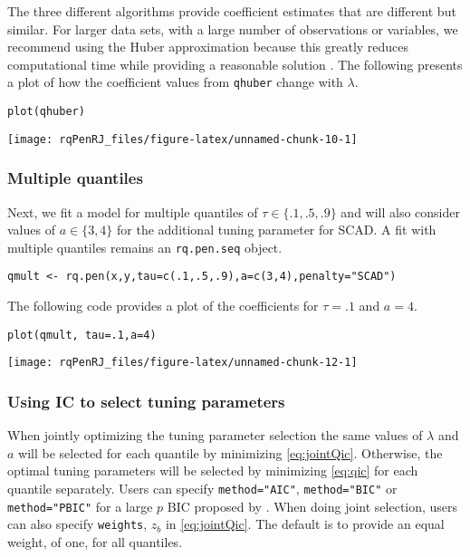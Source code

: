 The three different algorithms provide coefficient estimates that are different but similar. For larger data sets, with a large number of observations or variables, we recommend using the Huber approximation because this greatly reduces computational time while providing a reasonable solution \citep{huber_cd}. The following presents a plot of how the coefficient values from \texttt{qhuber} change with \(\lambda\).

\begin{verbatim}
plot(qhuber)
\end{verbatim}

\begin{center}\texttt{[image: rqPenRJ\_files/figure-latex/unnamed-chunk-10-1]} \end{center}

\subsubsection{Multiple quantiles}\label{multiple-quantiles}

Next, we fit a model for multiple quantiles of \(\tau \in \{.1,.5,.9\}\) and will also consider values of \(a \in \{3,4\}\) for the additional tuning parameter for SCAD. A fit with multiple quantiles remains an \texttt{rq.pen.seq} object.

\begin{verbatim}
qmult <- rq.pen(x,y,tau=c(.1,.5,.9),a=c(3,4),penalty="SCAD")
\end{verbatim}

The following code provides a plot of the coefficients for \(\tau=.1\) and \(a=4\).

\begin{verbatim}
plot(qmult, tau=.1,a=4)
\end{verbatim}

\begin{center}\texttt{[image: rqPenRJ\_files/figure-latex/unnamed-chunk-12-1]} \end{center}

\subsubsection{Using IC to select tuning parameters}\label{using-ic-to-select-tuning-parameters}

When jointly optimizing the tuning parameter selection the same values of \(\lambda\) and \(a\) will be selected for each quantile by minimizing \eqref{eq:jointQic}. Otherwise, the optimal tuning parameters will be selected by minimizing \eqref{eq:qic} for each quantile separately. Users can specify \texttt{method="AIC"}, \texttt{method="BIC"} or \texttt{method="PBIC"} for a large \(p\) BIC proposed by \citet{qrbic}. When doing joint selection, users can also specify \texttt{weights}, \(z_b\) in \eqref{eq:jointQic}. The default is to provide an equal weight, of one, for all quantiles.

